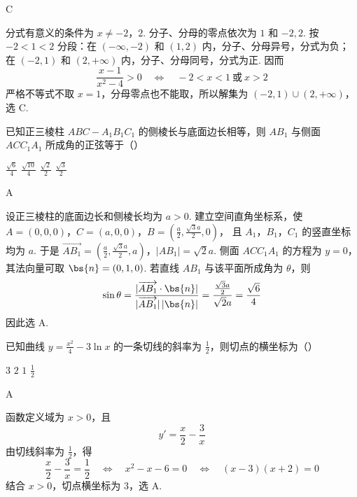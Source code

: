 \begin{answer}
C
\end{answer}

\begin{solution}
分式有意义的条件为 \(x\ne-2\)，\(2\). 分子、分母的零点依次为 \(1\) 和 \(-2,2\). 按 \(-2<1<2\) 分段：在 \((-\infty,-2)\) 和 \((1,2)\) 内，分子、分母异号，分式为负；在 \((-2,1)\) 和 \((2,+\infty)\) 内，分子、分母同号，分式为正. 因而
\[
\frac{x-1}{x^2-4}>0\quad\Longleftrightarrow\quad -2<x<1\ \text{或}\ x>2
\]
严格不等式不取 \(x=1\)，分母零点也不能取，所以解集为 \((-2,1)\cup(2,+\infty)\)，选 C.
\end{solution}

\begin{problem}
已知正三棱柱 \(ABC - A_{1}B_{1}C_{1}\) 的侧棱长与底面边长相等，则 \(AB_{1}\) 与侧面 \(ACC_{1}A_{1}\) 所成角的正弦等于（\quad）

\choices
    {\(\frac{\sqrt{6}}{4}\)}
    {\(\frac{\sqrt{10}}{4}\)}
    {\(\frac{\sqrt{2}}{2}\)}
    {\(\frac{\sqrt{3}}{2}\)}
\end{problem}

\begin{answer}
A
\end{answer}

\begin{solution}
设正三棱柱的底面边长和侧棱长均为 \(a>0\). 建立空间直角坐标系，使
\(A=(0,0,0)\)，\(C=(a,0,0)\)，\(B=\left(\frac a2,\frac{\sqrt3 a}{2},0\right)\)，
且 \(A_1\)，\(B_1\)，\(C_1\) 的竖直坐标均为 \(a\). 于是
\(\overrightarrow{AB_1}=\left(\frac a2,\frac{\sqrt3 a}{2},a\right)\)，\(|AB_1|=\sqrt2a\).
侧面 \(ACC_1A_1\) 的方程为 \(y=0\)，其法向量可取 \(\bs{n}=(0,1,0)\). 若直线 \(AB_1\) 与该平面所成角为 \(\theta\)，则
\[
\sin\theta=\frac{|\overrightarrow{AB_1}\cdot\bs{n}|}{|\overrightarrow{AB_1}|\,|\bs{n}|}
=\frac{\frac{\sqrt3a}{2}}{\sqrt2a}=\frac{\sqrt6}{4}
\]
因此选 A.
\end{solution}

\begin{problem}
已知曲线 \( y = \frac{x^2}{4} - 3\ln x \) 的一条切线的斜率为 \( \frac{1}{2} \)，则切点的横坐标为（\quad）

\choices
    {\(3\)}
    {\(2\)}
    {\(1\)}
    {\(\frac{1}{2}\)}
\end{problem}

\begin{answer}
A
\end{answer}

\begin{solution}
函数定义域为 \(x>0\)，且
\[
y'=\frac{x}{2}-\frac{3}{x}
\]
由切线斜率为 \(\frac12\)，得
\[
\frac{x}{2}-\frac{3}{x}=\frac12
\quad\Longleftrightarrow\quad x^2-x-6=0
\quad\Longleftrightarrow\quad (x-3)(x+2)=0
\]
结合 \(x>0\)，切点横坐标为 \(3\)，选 A.
\end{solution}

